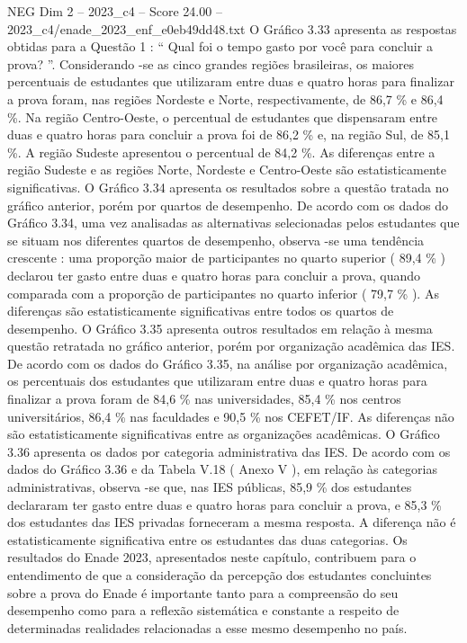 \begin{textsample}{NEG Dim 2 – 2023\_c4 – Score 24.00 – 2023\_c4/enade\_2023\_enf\_e0eb49dd48.txt}
O Gráfico 3.33 apresenta as respostas obtidas para a Questão 1 : “ Qual foi o tempo gasto por você para concluir a prova? ”.
Considerando -se as cinco grandes regiões brasileiras, os maiores percentuais de estudantes que utilizaram entre duas e quatro horas para finalizar a prova foram, nas regiões Nordeste e Norte, respectivamente, de 86,7 \% e 86,4 \%.
Na região Centro-Oeste, o percentual de estudantes que dispensaram entre duas e quatro horas para concluir a prova foi de 86,2 \% e, na região Sul, de 85,1 \%.
A região Sudeste apresentou o percentual de 84,2 \%.
As diferenças entre a região Sudeste e as regiões Norte, Nordeste e Centro-Oeste são estatisticamente significativas.
O Gráfico 3.34 apresenta os resultados sobre a questão tratada no gráfico anterior, porém por quartos de desempenho.
De acordo com os dados do Gráfico 3.34, uma vez analisadas as alternativas selecionadas pelos estudantes que se situam nos diferentes quartos de desempenho, observa -se uma tendência crescente : uma proporção maior de participantes no quarto superior ( 89,4 \% ) declarou ter gasto entre duas e quatro horas para concluir a prova, quando comparada com a proporção de participantes no quarto inferior ( 79,7 \% ).
As diferenças são estatisticamente significativas entre todos os quartos de desempenho.
O Gráfico 3.35 apresenta outros resultados em relação à mesma questão retratada no gráfico anterior, porém por organização acadêmica das IES.
De acordo com os dados do Gráfico 3.35, na análise por organização acadêmica, os percentuais dos estudantes que utilizaram entre duas e quatro horas para finalizar a prova foram de 84,6 \% nas universidades, 85,4 \% nos centros universitários, 86,4 \% nas faculdades e 90,5 \% nos CEFET/IF.
As diferenças não são estatisticamente significativas entre as organizações acadêmicas.
O Gráfico 3.36 apresenta os dados por categoria administrativa das IES.
De acordo com os dados do Gráfico 3.36 e da Tabela V.18 ( Anexo V ), em relação às categorias administrativas, observa -se que, nas IES públicas, 85,9 \% dos estudantes declararam ter gasto entre duas e quatro horas para concluir a prova, e 85,3 \% dos estudantes das IES privadas forneceram a mesma resposta.
A diferença não é estatisticamente significativa entre os estudantes das duas categorias.
Os resultados do Enade 2023, apresentados neste capítulo, contribuem para o entendimento de que a consideração da percepção dos estudantes concluintes sobre a prova do Enade é importante tanto para a compreensão do seu desempenho como para a reflexão sistemática e constante a respeito de determinadas realidades relacionadas a esse mesmo desempenho no país.

\end{textsample}

